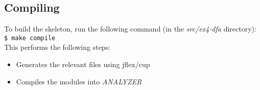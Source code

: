 \documentclass{article}
\begin{document}
\subsection{Compiling}
To build the skeleton, run the following command (in the \textit{src/ex4-dfa} directory): \\
\texttt{\$ make compile} \\
This performs the following steps:
\begin{itemize}
    \item Generates the relevant files using jflex/cup
    \item Compiles the modules into \textit{ANALYZER}
\end{itemize}

%




\end{document}
